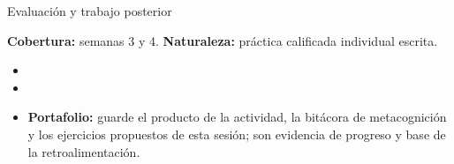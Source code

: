 \documentclass[10pt,aspectratio=169]{beamer}
\begin{document}
\begin{frame}{Evaluación y trabajo posterior}
  \small
  \begin{evalbox}
    \textbf{Cobertura:} semanas 3 y 4. \textbf{Naturaleza:} práctica calificada individual escrita.
  \end{evalbox}
  \begin{itemize}
    \item \criterios
    \item \declaracionia
    \item \textbf{Portafolio:} guarde el producto de la actividad, la bitácora de metacognición y los ejercicios propuestos de esta sesión; son evidencia de progreso y base de la retroalimentación.
  \end{itemize}
\end{frame}
\end{document}
